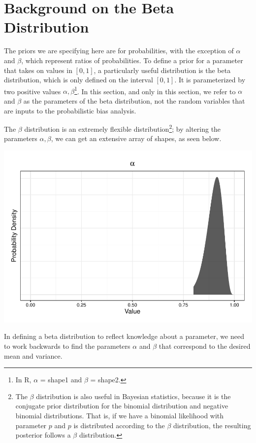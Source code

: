 \documentclass[12pt,twoside]{smiththesis}
\begin{document}
\hypertarget{background-on-the-beta-distribution}{%
\section{Background on the Beta Distribution}\label{background-on-the-beta-distribution}}

The priors we are specifying here are for probabilities, with the exception of \(\alpha\) and \(\beta\), which represent ratios of probabilities. To define a prior for a parameter that takes on values in \([0,1]\), a particularly useful distribution is the beta distribution, which is only defined on the interval \([0,1]\). It is parameterized by two positive values \(\alpha, \beta\)\footnote{In R, \(\alpha\) = shape1 and \(\beta\) = shape2.}. In this section, and only in this section, we refer to \(\alpha\) and \(\beta\) as the parameters of the beta distribution, not the random variables that are inputs to the probabilistic bias analysis.

The \(\beta\) distribution is an extremely flexible distribution\footnote{The \(\beta\) distribution is also useful in Bayesian statistics, because it is the conjugate prior distribution for the binomial distribution and negative binomial distributions. That is, if we have a binomial likelihood with parameter \(p\) and \(p\) is distributed according to the \(\beta\) distribution, the resulting posterior follows a \(\beta\) distribution.}; by altering the parameters \(\alpha, \beta\), we can get an extensive array of shapes, as seen below.
\begin{center}\includegraphics[width=0.8\linewidth]{thesis_files/figure-latex/unnamed-chunk-43-1} \end{center}

In defining a beta distribution to reflect knowledge about a parameter, we need to work backwards to find the parameters \(\alpha\) and \(\beta\) that correspond to the desired mean and variance.
\end{document}
